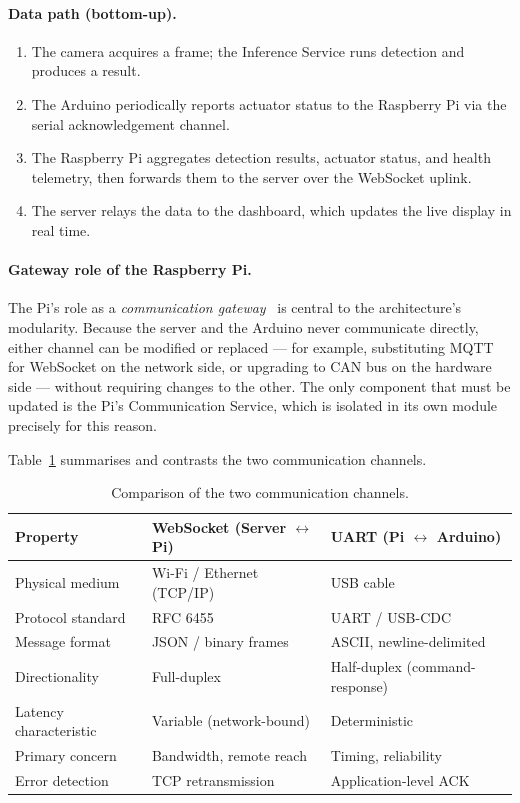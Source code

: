 \paragraph{Data path (bottom-up).}
\begin{enumerate}
    \item The camera acquires a frame; the Inference Service runs
          detection and produces a result.
    \item The Arduino periodically reports actuator status to the
          Raspberry Pi via the serial acknowledgement channel.
    \item The Raspberry Pi aggregates detection results, actuator
          status, and health telemetry, then forwards them to the
          server over the WebSocket uplink.
    \item The server relays the data to the dashboard, which updates
          the live display in real time.
\end{enumerate}
 
\paragraph{Gateway role of the Raspberry Pi.}
The Pi's role as a \emph{communication gateway}~\cite{tanenbaum2021networks}
is central to the architecture's modularity. Because the server and
the Arduino never communicate directly, either channel can be modified
or replaced — for example, substituting MQTT for WebSocket on the
network side, or upgrading to CAN bus on the hardware side — without
requiring changes to the other. The only component that must be updated
is the Pi's Communication Service, which is isolated in its own
module precisely for this reason.
 
Table~\ref{tab:comms_compare} summarises and contrasts the two
communication channels.
 
\begin{table}[h]
\centering
\caption{Comparison of the two communication channels.}
\label{tab:comms_compare}
\begin{tabular}{lll}
\hline
\textbf{Property}       & \textbf{WebSocket (Server $\leftrightarrow$ Pi)}
                        & \textbf{UART (Pi $\leftrightarrow$ Arduino)} \\
\hline
Physical medium         & Wi-Fi / Ethernet (TCP/IP)  & USB cable           \\
Protocol standard       & RFC 6455                   & UART / USB-CDC      \\
Message format          & JSON / binary frames       & ASCII, newline-delimited \\
Directionality          & Full-duplex                & Half-duplex (command-response) \\
Latency characteristic  & Variable (network-bound)   & Deterministic       \\
Primary concern         & Bandwidth, remote reach    & Timing, reliability \\
Error detection         & TCP retransmission         & Application-level ACK \\
\hline
\end{tabular}
\end{table}
 
